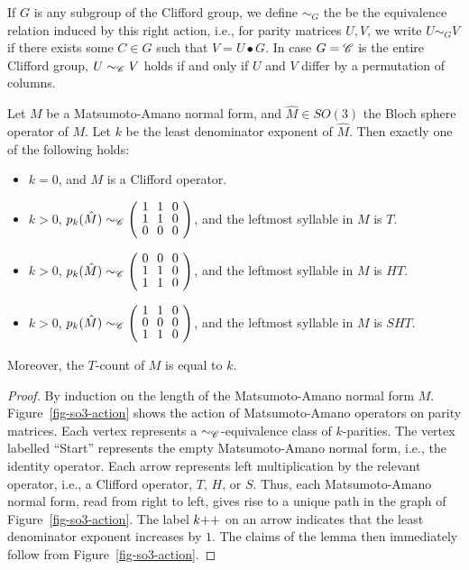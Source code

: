 \begin{definition}\label{def-simg}
  If $G$ is any subgroup of the Clifford group, we define $\sim_G$ the be the equivalence relation
  induced by this right action, i.e., for parity matrices $U,V$, we write $U\sim_G V$ if there
  exists some $C\in G$ such that $V=U\bullet G$. In case $G=\mathscr{C}$ is the entire Clifford group,
  $U\sim_{\mathscr{C}} V$ holds if and only if $U$ and $V$ differ by a permutation of columns.
\end{definition}

\begin{lemma}\label{lem-ma}
  Let $M$ be a Matsumoto-Amano normal form, and $\hat M\in SO(3)$ the Bloch sphere operator of $M$.
  Let $k$ be the least denominator exponent of $\hat M$. Then exactly one of the following holds:\rm
  \begin{itemize}
    \item $k=0$, and $M$ is a Clifford operator.
    \item $k>0$, $p_k(\hat M)\sim_{\sC} \zmatrix{ccc}{1&1&0 \\ 1&1&0 \\
        0&0&0}$, and the leftmost syllable in $M$ is $T$.
    \item $k>0$, $p_k(\hat M)\sim_{\sC} \zmatrix{ccc}{0&0&0 \\ 1&1&0 \\ 1&1&0}$, and the
      leftmost syllable in $M$ is $HT$.
    \item $k>0$, $p_k(\hat M)\sim_{\sC} \zmatrix{ccc}{1&1&0 \\ 0&0&0 \\
        1&1&0}$, and the leftmost syllable in $M$ is $SHT$.
  \end{itemize}
  Moreover, the $T$-count of $M$ is equal to $k$.
\end{lemma}

\begin{proof}
  By induction on the length of the Matsumoto-Amano normal form $M$. Figure~\vref{fig-so3-action}
  shows the action of Matsumoto-Amano operators on parity matrices. Each vertex represents a
  $\sim_{\mathscr{C}}$-equivalence class of $k$-parities. The vertex labelled ``Start'' represents the
  empty Matsumoto-Amano normal form, i.e., the identity operator. Each arrow represents left
  multiplication by the relevant operator, i.e., a Clifford operator, $T$, $H$, or $S$. Thus, each
  Matsumoto-Amano normal form, read from right to left, gives rise to a unique path in the graph of
  Figure~\vref{fig-so3-action}. The label $k{++}$ on an arrow indicates that the least denominator
  exponent increases by $1$. The claims of the lemma then immediately follow from
  Figure~\vref{fig-so3-action}.
\end{proof}

